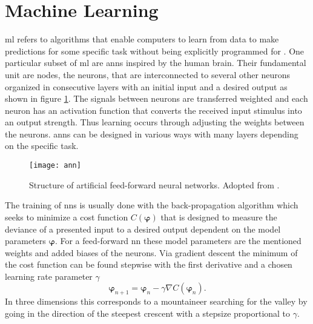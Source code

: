 \section{Machine Learning}
\ac{ml} refers to algorithms that enable computers to learn from data to make predictions for some specific task without being explicitly programmed for \citep{kubat2021introduction}. One particular subset of \ac{ml} are \acp{ann} inspired by the human brain. Their fundamental unit are nodes, the neurons, that are interconnected to several other neurons organized in consecutive layers with an initial input and a desired output as shown in figure \ref{fig:ann}. The signals between neurons are transferred weighted and each neuron has an activation function that converts the received input stimulus into an output strength. Thus learning occurs through adjusting the weights between the neurons. \acp{ann} can be designed in various ways with many layers depending on the specific task.
\begin{figure}
    \centering
    \texttt{[image: ann]}
    \caption[]{Structure of artificial feed-forward neural networks. Adopted from \citep{8114708}.}
    \label{fig:ann}
\end{figure}

The training of \acp{nn} is usually done with the back-propagation algorithm which seeks to minimize a cost function $C(\bm{\varphi})$ that is designed to measure the deviance of a presented input to a desired output dependent on the model parameters $\bm{\varphi}$. For a feed-forward \ac{nn} these model parameters are the mentioned weights and added biases of the neurons. Via gradient descent the minimum of the cost function can be found stepwise with the first derivative and a chosen learning rate parameter $\gamma$
\begin{equation}
    \bm{\varphi}_{n+1} = \bm{\varphi}_n-\gamma\nabla C(\bm{\varphi}_n).
    \label{eq:grad_descent}
\end{equation}
In three dimensions this corresponds to a mountaineer searching for the valley by going in the direction of the steepest crescent with a stepsize proportional to $\gamma$.



